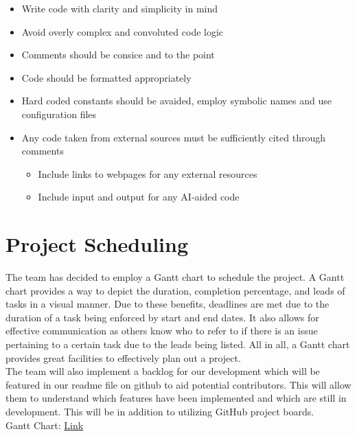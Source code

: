 \documentclass{article}
\begin{document}
\begin{itemize}
\begin{itemize}
  \end{itemize}

\item Write code with clarity and simplicity in mind
\item Avoid overly complex and convoluted code logic
\item Comments should be consice and to the point
\item Code should be formatted appropriately
\item Hard coded constants should be avaided, employ symbolic names and use configuration files 
\item Any code taken from external sources must be sufficiently cited through comments
\begin{itemize}
  \item Include links to webpages for any external resources
  \item Include input and output for any AI-aided code
\end{itemize}


\end{itemize}


\newpage

\section{Project Scheduling}

The team has decided to employ a Gantt chart to schedule the project. A Gantt chart provides a way to depict the duration, completion percentage, and leads of tasks in a visual manner. Due to these benefits, deadlines are met due to the duration of a task being enforced by start and end dates. It also allows for effective communication as others know who to refer to if there is an issue pertaining to a certain task due to the leads being listed. All in all, a Gantt chart provides great facilities to effectively plan out a project. \\

The team will also implement a backlog for our development which will be featured in our readme file on github to aid potential contributors. This will allow them to understand which features have been implemented and which are still in development. This will be in addition to utilizing GitHub project boards.\\

Gantt Chart: \href{https://mcmasteru365-my.sharepoint.com/:x:/g/personal/bhatth14_mcmaster_ca/ESjvjVJfZflPvcV8xfFiPxEBNGdj_fdNWy0EyGGiqIbAEw?e=9wUfQj}{Link}
\end{document}
